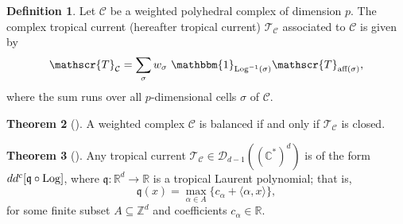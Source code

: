 \documentclass[11pt]{amsart}
\def\Log{{\rm Log}}
\theoremstyle{definition}
\newtheorem{theorem}{Theorem}[section]
\newtheorem{definition}[theorem]{Definition}
\newtheorem{remark}[theorem]{Remark}
\newcommand{\R}{\mathbb{R}}
\newcommand{\Z}{\mathbb{Z}}
\newcommand{\C}{\mathbb{C}}
\newcommand{\sD}{\mathscr{D}}
\newcommand{\cC}{\mathcal{C}}
\newcommand{\sT}{\mathscr{T}}
\newcommand{\fq}{\mathfrak{q}}
\begin{document}
\begin{definition}
Let $\mathcal{C}$ be a weighted polyhedral complex of dimension $p$. The complex tropical current (hereafter tropical current) $\mathscr{T}_{\mathcal{C}}$ associated to ${\mathcal{C}}$ is given by
$$
\mathscr{T}_{\mathcal{C}}= \sum_{\sigma} w_{\sigma} ~ \mathbbm{1}_{\Log^{-1}(\sigma)}\mathscr{T}_{\text{aff}(\sigma)} ,
$$
where the sum runs over all $p$-dimensional cells $\sigma$ of $\cC.$
\end{definition}



\begin{theorem}[\cite{Babaee}]\label{thm:closed-balanced}
A weighted complex \(\mathcal{C}\) is balanced if and only if \(\mathscr{T}_{\mathcal{C}}\) is closed.
\end{theorem}

\begin{theorem}[\cite{Babaee}]\label{thm:hyper-ddc}
Any tropical current \(\sT_{\cC} \in \sD_{d-1}((\C^*)^d)\) is of the form \(dd^c [\fq \circ \Log]\), where \(\fq : \R^d \to \R\) is a tropical Laurent polynomial; that is,
\[
\fq(x) = \max_{\alpha \in A} \{ c_{\alpha} + \langle \alpha, x \rangle \},
\]
for some finite subset \(A \subseteq \Z^d\) and coefficients \(c_{\alpha} \in \R\).
\end{theorem}
\end{document}
